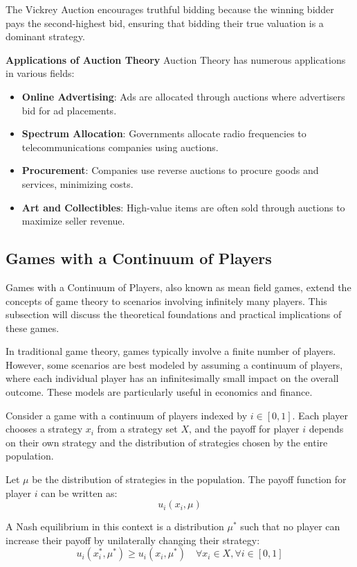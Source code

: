 \documentclass[12pt]{book} %
\begin{document}
The Vickrey Auction encourages truthful bidding because the winning bidder pays the second-highest bid, ensuring that bidding their true valuation is a dominant strategy.

\textbf{Applications of Auction Theory}
Auction Theory has numerous applications in various fields:

\begin{itemize}
    \item \textbf{Online Advertising}: Ads are allocated through auctions where advertisers bid for ad placements.
    \item \textbf{Spectrum Allocation}: Governments allocate radio frequencies to telecommunications companies using auctions.
    \item \textbf{Procurement}: Companies use reverse auctions to procure goods and services, minimizing costs.
    \item \textbf{Art and Collectibles}: High-value items are often sold through auctions to maximize seller revenue.
\end{itemize}

\subsection{Games with a Continuum of Players}
Games with a Continuum of Players, also known as mean field games, extend the concepts of game theory to scenarios involving infinitely many players. This subsection will discuss the theoretical foundations and practical implications of these games.

In traditional game theory, games typically involve a finite number of players. However, some scenarios are best modeled by assuming a continuum of players, where each individual player has an infinitesimally small impact on the overall outcome. These models are particularly useful in economics and finance.

Consider a game with a continuum of players indexed by $i \in [0,1]$. Each player chooses a strategy $x_i$ from a strategy set $X$, and the payoff for player $i$ depends on their own strategy and the distribution of strategies chosen by the entire population.

Let $\mu$ be the distribution of strategies in the population. The payoff function for player $i$ can be written as:
\[
u_i(x_i, \mu)
\]

A Nash equilibrium in this context is a distribution $\mu^*$ such that no player can increase their payoff by unilaterally changing their strategy:
\[
u_i(x_i^*, \mu^*) \geq u_i(x_i, \mu^*) \quad \forall x_i \in X, \forall i \in [0,1]
\]
\end{document}
